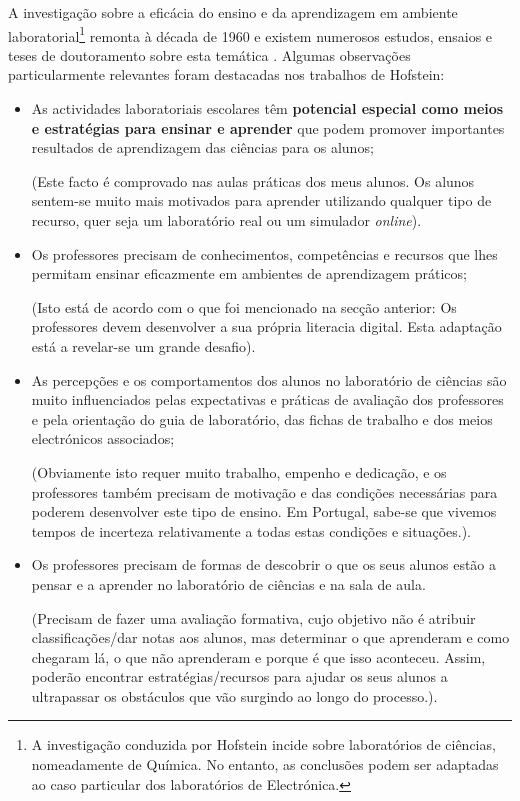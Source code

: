 A investigação sobre a eficácia do ensino e da aprendizagem em ambiente laboratorial\footnote{\label{nota1}A investigação conduzida por Hofstein \cite{Hofstein} incide sobre laboratórios de ciências, nomeadamente de Química. No entanto, as conclusões podem ser adaptadas ao caso particular dos laboratórios de Electrónica.} remonta à década de 1960 e existem numerosos estudos, ensaios e teses de doutoramento sobre esta temática \cite{Hofstein}. Algumas observações particularmente relevantes foram destacadas nos trabalhos de Hofstein:
\begin{itemize}
    \item As actividades laboratoriais escolares têm \textbf{potencial especial como meios e estratégias para ensinar e aprender} que podem promover importantes resultados de aprendizagem das ciências para os alunos;

          (Este facto é comprovado nas aulas práticas dos meus alunos. Os alunos sentem-se muito mais motivados para aprender utilizando qualquer tipo de recurso, quer seja um laboratório real ou um simulador \textit{online}).
    \item Os professores precisam de conhecimentos, competências e recursos que lhes permitam ensinar eficazmente em ambientes de aprendizagem práticos;

          (Isto está de acordo com o que foi mencionado na secção anterior: Os professores devem desenvolver a sua própria literacia digital. Esta adaptação está a revelar-se um grande desafio).
    \item As percepções e os comportamentos dos alunos no laboratório de ciências são muito influenciados pelas expectativas e práticas de avaliação dos professores e pela orientação do guia de laboratório, das fichas de trabalho e dos meios electrónicos associados;

          (Obviamente isto requer muito trabalho, empenho e dedicação, e os professores também precisam de motivação e das condições necessárias para poderem desenvolver este tipo de ensino. Em Portugal, sabe-se que vivemos tempos de incerteza relativamente a todas estas condições e situações.).

    \item Os professores precisam de formas de descobrir o que os seus alunos estão a pensar e a aprender no laboratório de ciências e na sala de aula.

          (Precisam de fazer uma avaliação formativa, cujo objetivo não é atribuir classificações/dar notas aos alunos, mas determinar o que aprenderam e como chegaram lá, o que não aprenderam e porque é que isso aconteceu. Assim, poderão encontrar estratégias/recursos para ajudar os seus alunos a ultrapassar os obstáculos que vão surgindo ao longo do processo.).
\end{itemize}
